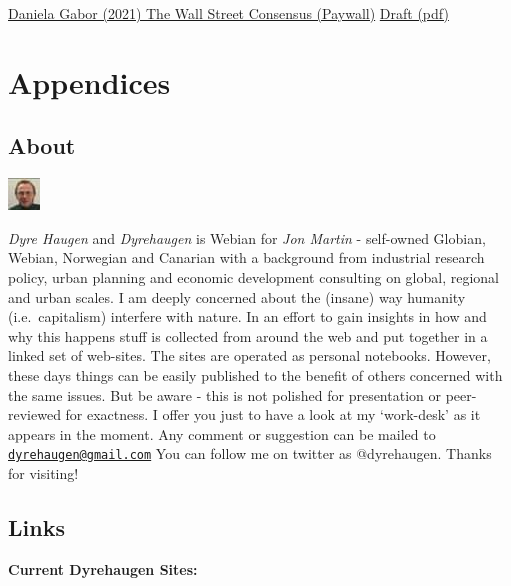\documentclass[
]{book}
\begin{document}
\href{https://onlinelibrary.wiley.com/doi/abs/10.1111/dech.12645}{Daniela Gabor (2021) The Wall Street Consensus (Paywall)}
\href{pdf/Gabor_2021_Wall_Street_Consensus.pdf}{Draft (pdf)}

\hypertarget{part-appendices}{%
\part{Appendices}\label{part-appendices}}

\hypertarget{appendix-appendices}{%
\appendix}


\hypertarget{about}{%
\chapter{About}\label{about}}

\includegraphics{fig/me.jpg}

\emph{Dyre Haugen} and \emph{Dyrehaugen} is Webian for \emph{Jon Martin} -
self-owned Globian, Webian, Norwegian and Canarian with
a background from industrial research policy, urban planning and
economic development consulting on global, regional and urban scales.
I am deeply concerned about the (insane) way
humanity (i.e.~capitalism) interfere with nature.
In an effort to gain insights in how and why this happens
stuff is collected from around the web and put together
in a linked set of web-sites.
The sites are operated as personal notebooks.
However, these days things can be easily published to the
benefit of others concerned with the same issues.
But be aware - this is not polished for presentation or
peer-reviewed for exactness.
I offer you just to have a look at my `work-desk' as it appears in the moment.
Any comment or suggestion can be mailed to \href{mailto:dyrehaugen@gmail.com}{\nolinkurl{dyrehaugen@gmail.com}}
You can follow me on twitter as @dyrehaugen.
Thanks for visiting!

\hypertarget{links}{%
\chapter{Links}\label{links}}

\textbf{Current Dyrehaugen Sites:}
\end{document}
